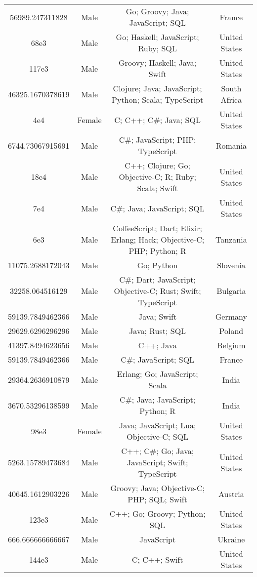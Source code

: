 \begin{center}
\begin{tabular}{ |c|c|c|c| }
56989.247311828  &  Male  &  Go; Groovy; Java; JavaScript; SQL  &  France  \\ 
68e3  &  Male  &  Go; Haskell; JavaScript; Ruby; SQL  &  United States  \\ 
117e3  &  Male  &  Groovy; Haskell; Java; Swift  &  United States  \\ 
46325.1670378619  &  Male  &  Clojure; Java; JavaScript; Python; Scala; TypeScript  &  South Africa  \\ 
4e4  &  Female  &  C; C++; C\#; Java; SQL  &  United States  \\ 
6744.73067915691  &  Male  &  C\#; JavaScript; PHP; TypeScript  &  Romania  \\ 
18e4  &  Male  &  C++; Clojure; Go; Objective-C; R; Ruby; Scala; Swift  &  United States  \\ 
7e4  &  Male  &  C\#; Java; JavaScript; SQL  &  United States  \\ 
6e3  &  Male  &  CoffeeScript; Dart; Elixir; Erlang; Hack; Objective-C; PHP; Python; R  &  Tanzania  \\ 
11075.2688172043  &  Male  &  Go; Python  &  Slovenia  \\ 
32258.064516129  &  Male  &  C\#; Dart; JavaScript; Objective-C; Rust; Swift; TypeScript  &  Bulgaria  \\ 
59139.7849462366  &  Male  &  Java; Swift  &  Germany  \\ 
29629.6296296296  &  Male  &  Java; Rust; SQL  &  Poland  \\ 
41397.8494623656  &  Male  &  C++; Java  &  Belgium  \\ 
59139.7849462366  &  Male  &  C\#; JavaScript; SQL  &  France  \\ 
29364.2636910879  &  Male  &  Erlang; Go; JavaScript; Scala  &  India  \\ 
3670.53296138599  &  Male  &  C\#; Java; JavaScript; Python; R  &  India  \\ 
98e3  &  Female  &  Java; JavaScript; Lua; Objective-C; SQL  &  United States  \\ 
5263.15789473684  &  Male  &  C++; C\#; Go; Java; JavaScript; Swift; TypeScript  &  United States  \\ 
40645.1612903226  &  Male  &  Groovy; Java; Objective-C; PHP; SQL; Swift  &  Austria  \\ 
123e3  &  Male  &  C++; Go; Groovy; Python; SQL  &  United States  \\ 
666.666666666667  &  Male  &  JavaScript  &  Ukraine  \\ 
144e3  &  Male  &  C; C++; Swift  &  United States  \\ 

\end{tabular}
\end{center}
